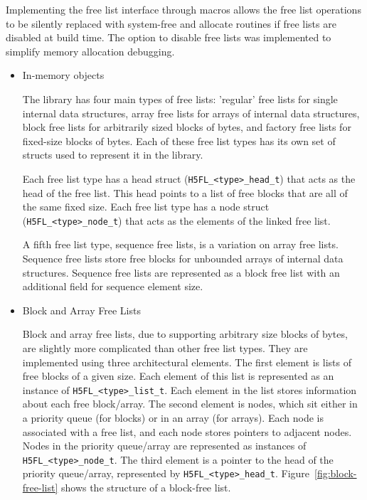 Implementing the free list interface through macros allows the free list operations to be silently replaced with system-free and allocate routines if free lists are disabled at build time. The option to disable free lists was implemented to simplify memory allocation debugging.

\begin{itemize}

\item In-memory objects

The library has four main types of free lists: 'regular' free lists for single internal data structures, array free lists for arrays of internal data structures, block free lists for arbitrarily sized blocks of bytes, and factory free lists for fixed-size blocks of bytes. Each of these free list types has its own set of structs used to represent it in the library.

Each free list type has a head struct (\texttt{H5FL\_<type>\_head\_t}) that acts as the head of the free list. This head points to a list of free blocks that are all of the same fixed size. Each free list type has a node struct (\texttt{H5FL\_<type>\_node\_t}) that acts as the elements of the linked free list.


A fifth free list type, sequence free lists, is a variation on array free lists. Sequence free lists store free blocks for unbounded arrays of internal data structures. Sequence free lists are represented as a block free list with an additional field for sequence element size.

\item Block and Array Free Lists

Block and array free lists, due to supporting arbitrary size blocks of bytes, are slightly more complicated than other free list types. They are implemented using three architectural elements. The first element is lists of free blocks of a given size. Each element of this list is represented as an instance of \texttt{H5FL\_<type>\_list\_t}. Each element in the list stores information about each free block/array. The second element is nodes, which sit either in a priority queue (for blocks) or in an array (for arrays). Each node is associated with a free list, and each node stores pointers to adjacent nodes. Nodes in the priority queue/array are represented as instances of \texttt{H5FL\_<type>\_node\_t}. The third element is a pointer to the head of the priority queue/array, represented by \texttt{H5FL\_<type>\_head\_t}. Figure~\ref{fig:block-free-list} shows the structure of a block-free list.


\end{itemize}
